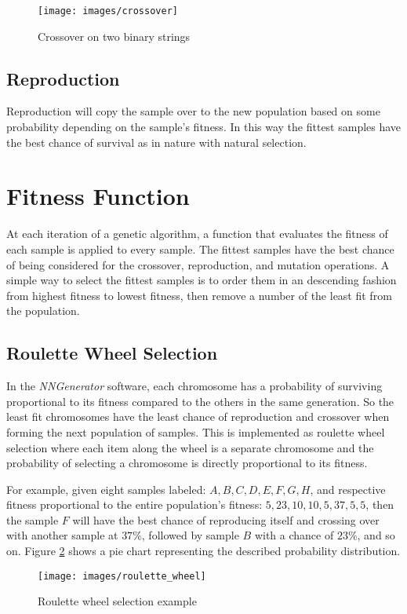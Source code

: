 \begin{figure}[h!]
  \centering
  \texttt{[image: images/crossover]}
  \caption{Crossover on two binary strings}
  \label{crossover}
\end{figure}

\subsection{Reproduction}
Reproduction will copy the sample over to the new population based on some probability depending on the sample's fitness. 
In this way the fittest samples have the best chance of survival as in nature with natural selection.

\section{Fitness Function}
At each iteration of a genetic algorithm, a function that evaluates the fitness of each sample is applied to every sample.
The fittest samples have the best chance of being considered for the crossover, reproduction, and mutation operations.
A simple way to select the fittest samples is to order them in an descending fashion from highest fitness to lowest fitness, then remove a number of the least fit from the population.

\subsection{Roulette Wheel Selection}
In the {\it NNGenerator} software, each chromosome has a probability of surviving proportional to its fitness compared to the others in the same generation. 
So the least fit chromosomes have the least chance of reproduction and crossover when forming the next population of samples. 
This is implemented as roulette wheel selection where each item along the wheel is a separate chromosome and the probability of selecting a chromosome is directly proportional to its fitness.

For example, given eight samples labeled: $A, B, C, D, E, F, G, H$, and respective fitness proportional to the entire population's fitness: 
$5, 23, 10, 10, 5, 37, 5, 5$, then the sample $F$ will have the best chance of reproducing itself and crossing over with another sample at $37\%$, followed by sample $B$ with a chance of $23\%$, and so on.
Figure \ref{roulette_wheel} shows a pie chart representing the described probability distribution.

\begin{figure}[h!]
  \centering
  \texttt{[image: images/roulette\_wheel]}
  \caption{Roulette wheel selection example}
  \label{roulette_wheel}
\end{figure}
